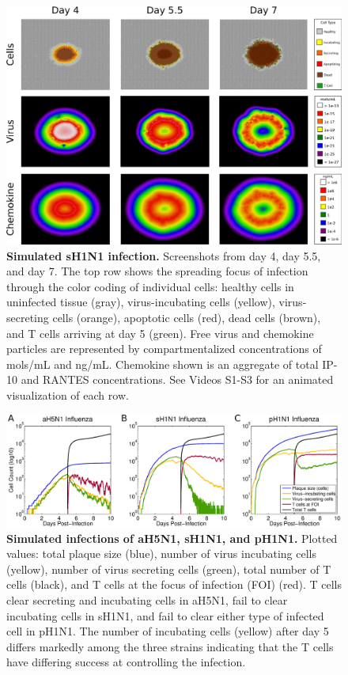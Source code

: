 \documentclass[preprint,10pt,numbers]{elsarticle}
\begin{document}
\begin{figure}[!ht]
\begin{center}
\includegraphics[width=\textwidth]{Figure_5}
 \end{center}
\caption{{\bf Simulated sH1N1 infection.} Screenshots from day 4, day 5.5, and day 7.  The top row shows the spreading focus of infection  through the color coding of individual cells:  healthy cells in uninfected tissue (gray),  virus-incubating cells (yellow), virus-secreting cells (orange), apoptotic cells (red), dead cells (brown), and T cells arriving at day 5 (green).  Free virus and chemokine particles are represented by compartmentalized concentrations of mols/mL and ng/mL.  Chemokine shown is an aggregate of total IP-10 and RANTES concentrations.  See Videos S1-S3 for an animated visualization of each row.} 
 \label{fig:cycells}
\end{figure}


\begin{figure}[!ht]
\begin{center}
\includegraphics[width=\textwidth]{Figure_6}
 \end{center}
\caption{{\bf Simulated infections of aH5N1, sH1N1, and pH1N1.} Plotted values: total plaque size (blue), number of virus incubating cells (yellow), number of virus secreting cells (green), total number of T cells (black), and T cells at the focus of infection (FOI) (red).  T cells clear secreting and incubating cells in aH5N1, fail to clear incubating cells in sH1N1, and fail to clear either type of infected cell in pH1N1.  The number of incubating cells (yellow) after day 5 differs markedly among the three strains indicating that the T cells have differing success at controlling the infection.} 
 \label{fig:plaquesize}
\end{figure}
\end{document}

